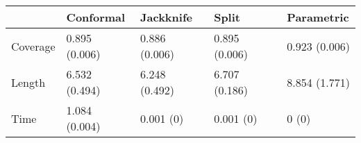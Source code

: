 \begin{tabular}{|l|l|l|l|l|}
\hline
& Conformal & Jackknife & Split & Parametric \\
\hline
Coverage & 0.895 (0.006) & 0.886 (0.006) & 0.895 (0.006) & 0.923 (0.006) \\
\hline
Length & 6.532 (0.494) & 6.248 (0.492) & 6.707 (0.186) & 8.854 (1.771) \\
\hline
Time & 1.084 (0.004) & 0.001 (0) & 0.001 (0) & 0 (0) \\
\hline
\end{tabular}
